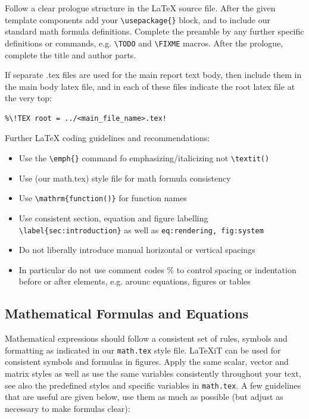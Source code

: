 \documentclass[11pt, a4paper,oneside,chapterprefix=false]{scrbook}
\newcommand{\FIXME}[1]{{\color{RED}{\textbf{FIX}: #1}}}
\begin{document}
Follow a clear prologue structure in the LaTeX source file. After the given template components add your \verb!\usepackage{}! block, and \verb!! to include our standard math formula definitions. Complete the preamble by any further specific definitions or commands, e.g. \verb!\TODO! and \verb!\FIXME! macros. After the prologue, complete the title and author parts.

If separate .tex files are used for the main report text body, then include them in the main body latex file, and in each of these files indicate the root latex file at the very top:
\begin{verbatim}
%\!TEX root = ../<main_file_name>.tex!
\end{verbatim}

\noindent
Further LaTeX coding guidelines and recommendations:

\begin{itemize}
\item Use the \verb!\emph{}! command fo emphasizing/italicizing not \verb!\textit()!
\item Use (our math.tex) style file for math formula consistency
\item Use \verb!\mathrm{function()}!  for function names
\item Use consistent section, equation and figure labelling
\verb!\label{sec:introduction}! as well as \texttt{eq:rendering, fig:system}
\item Do not liberally introduce manual horizontal or vertical spacings
\item In particular do not use comment codes \% to control spacing or indentation before or after elements, e.g. arounc equations, figures or tables
\end{itemize}

\subsection*{Mathematical Formulas and Equations}

Mathematical expressions should follow a consistent set of rules, symbols and formatting as indicated in our \texttt{math.tex} style file. LaTeXiT can be used for consistent symbols and formulas in figures. Apply the same scalar, vector and matrix styles as well as use the same variables consistently throughout your text, see also the predefined styles and specific variables in \texttt{math.tex}. A few guidelines that are useful are given below, use them as much as possible (but adjust as necessary to make formulas clear):
\end{document}
